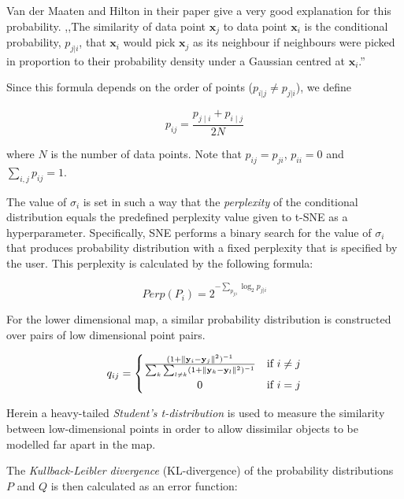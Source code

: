 Van der Maaten and Hilton in their paper\cite{bib:tsne} give a very good explanation for this probability. ,,The similarity of data point $\mathbf{x}_j$ to data point $\mathbf{x}_i$ is the conditional probability, $p_{j|i}$, that $\mathbf{x}_i$ would pick $\mathbf{x}_j$ as its neighbour if neighbours were picked in proportion to their probability density under a Gaussian centred at $\mathbf{x}_i$.''

Since this formula depends on the order of points ($p_{i|j} \neq p_{j|i}$), we define

\begin{equation}
	\label{eq:tsne:pij}
	p_{ij}={\frac {p_{j\mid i}+p_{i\mid j}}{2N}}
\end{equation}

where $N$ is the number of data points. Note that $p_{ij} = p_{ji}$, $p_{ii} = 0$ and $\displaystyle\sum_{i, j}p_{ij} = 1$.

The value of $\sigma_{i}$ is set in such a way that the \textit{perplexity} of the conditional distribution equals the predefined perplexity value given to t-SNE as a hyperparameter. Specifically, SNE performs a binary search for the value of $\sigma_{i}$ that produces probability distribution with a fixed perplexity that is specified by the user. This perplexity is calculated by the following formula:

\begin{equation}
	\label{eq:tsne:perlexity}
	Perp(P_i) = 2^{-\sum_{p_{j|i}} \log_2 p_{j|i}}
\end{equation}

For the lower dimensional map, a similar probability distribution is constructed over pairs of low dimensional point pairs.

\begin{equation}
	\label{eq:tsne:qij}
	q_{ij} =
	\begin{cases}
		{\frac{(1+\lVert \mathbf{y}_{i} - \mathbf{y}_{j}\rVert^{2})^{-1}}{\sum_{k}\sum_{l \neq k}(1+\lVert \mathbf{y}_{k} - \mathbf{y}_{l}\rVert ^{2})^{-1}}} & \textrm{if } i \neq j \\
		\hfil 0 & \textrm{if } i = j
	\end{cases}
\end{equation}

Herein a heavy-tailed \textit{Student's t-distribution} is used to measure the similarity between low-dimensional points in order to allow dissimilar objects to be modelled far apart in the map.

The \textit{Kullback-Leibler divergence} (KL-divergence)\cite{bib:kldiv} of the probability distributions $P$ and $Q$ is then calculated as an error function:

